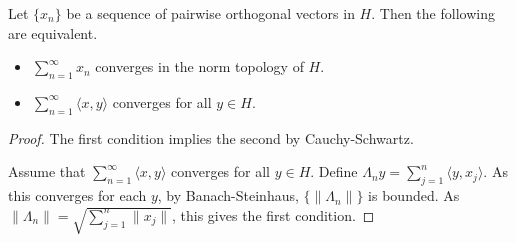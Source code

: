 \begin{lemma}[12.6, part 2]
 Let $\{x_n\}$ be a sequence of pairwise orthogonal vectors in $H$.
 Then the following are equivalent.
 \begin{itemize}
  \item $\sum_{n=1}^\infty x_n$ converges in the norm topology of $H$.
  \item $\sum_{n=1}^\infty \langle x, y\rangle$ converges for all $y \in H$.
 \end{itemize}
\end{lemma}
\begin{proof}
 The first condition implies the second by Cauchy-Schwartz.

 Assume that
 $\sum_{n=1}^\infty \langle x, y\rangle$ converges for all $y \in H$.
 Define $\Lambda_n y = \sum_{j=1}^n \langle y, x_j\rangle$.
 As this converges for each $y$, by Banach-Steinhaus, $\{\|\Lambda_n\|\}$ is bounded.
 As $\|\Lambda_n\| = \sqrt{\sum_{j=1}^n \|x_j\|}$, this gives the first condition.
\end{proof}
